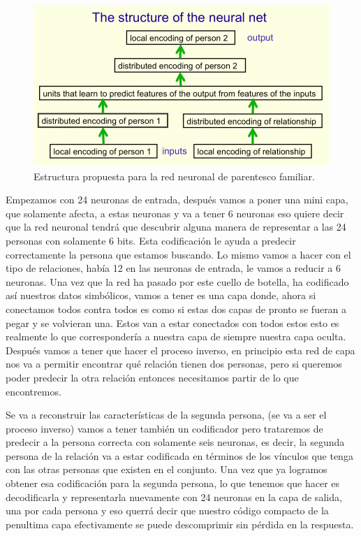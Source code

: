  
  \begin{figure}[h]
   \centering
   \includegraphics[scale=.5]{../Figuras/Hinton/RedHinton86.png}
   \caption{Estructura propuesta para la red neuronal de parentesco familiar.}
  \label{fig:RH86}
  \end{figure}

   Empezamos con 24 neuronas de entrada, después vamos a poner una mini capa, que solamente afecta, a estas neuronas y va a tener 6 neuronas eso quiere decir que la red neuronal tendrá que descubrir alguna manera de representar a las 24 personas con solamente 6 bits. Esta codificación le ayuda a predecir correctamente la persona que estamos buscando. Lo mismo vamos a hacer con el tipo de relaciones, había 12 en las neuronas de entrada, le vamos a reducir a 6 neuronas. Una vez que la red ha pasado por este cuello de botella, ha codificado así nuestros datos simbólicos, vamos a tener es una capa donde, ahora si conectamos todos contra todos es como si estas dos capas de pronto se fueran a pegar y se volvieran una. Estos van a estar conectados con todos estos esto es realmente lo que correspondería a nuestra capa de siempre nuestra capa oculta. Después vamos a tener que hacer el proceso inverso, en principio esta red de capa nos va a permitir encontrar  qué relación tienen dos personas, pero si queremos poder predecir la otra relación entonces necesitamos partir de lo que encontremos.
 
 Se va a reconstruir las características de la segunda persona, (se va a ser el proceso inverso) vamos a tener también un codificador pero  trataremos de predecir a la persona correcta con solamente seis neuronas, es decir, la segunda persona de la relación va a estar codificada en términos de los vínculos que tenga con las otras personas que existen en el conjunto. Una vez que ya logramos obtener esa codificación para la segunda persona, lo que tenemos que hacer es decodificarla y representarla nuevamente con 24 neuronas en la capa de salida, una por cada persona y eso querrá decir que nuestro código compacto de la penultima capa  efectivamente se puede descomprimir sin pérdida en la respuesta.

